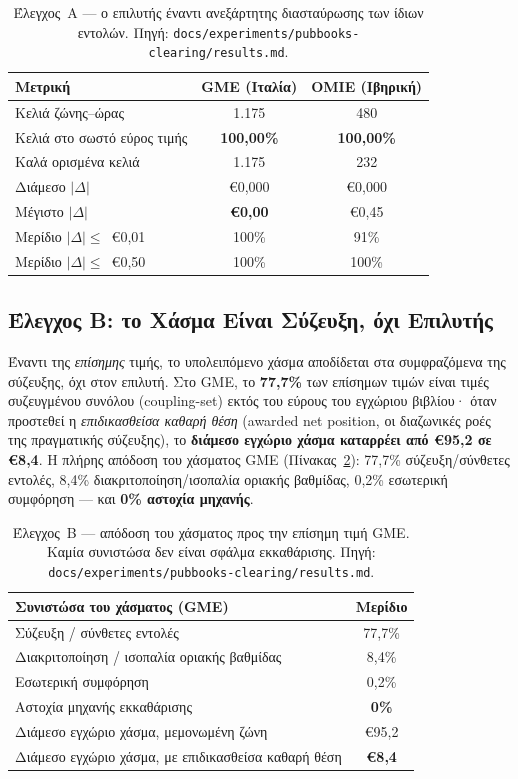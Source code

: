 \begin{table}[htbp]
\centering
\caption{Έλεγχος~Α --- ο επιλυτής έναντι ανεξάρτητης διασταύρωσης των ίδιων εντολών. Πηγή: \texttt{docs/experiments/pubbooks-clearing/results.md}.}
\label{tab:pubbooks-solver}
\begin{tabular}{@{}lcc@{}}
\toprule
\textbf{Μετρική} & \textbf{GME (Ιταλία)} & \textbf{OMIE (Ιβηρική)} \\
\midrule
Κελιά ζώνης--ώρας & 1.175 & 480 \\
Κελιά στο σωστό εύρος τιμής & \textbf{100,00\%} & \textbf{100,00\%} \\
Καλά ορισμένα κελιά & 1.175 & 232 \\
Διάμεσο $|\Delta|$ & €0,000 & €0,000 \\
Μέγιστο $|\Delta|$ & \textbf{€0,00} & €0,45 \\
Μερίδιο $|\Delta|\le$~€0,01 & 100\% & 91\% \\
Μερίδιο $|\Delta|\le$~€0,50 & 100\% & 100\% \\
\bottomrule
\end{tabular}
\end{table}

\subsection{Έλεγχος Β: το Χάσμα Είναι Σύζευξη, όχι Επιλυτής}
\label{subsec:pubbooks-attribution}

Έναντι της \emph{επίσημης} τιμής, το υπολειπόμενο χάσμα αποδίδεται στα συμφραζόμενα της σύζευξης, όχι στον επιλυτή. Στο GME, το \textbf{77,7\%} των επίσημων τιμών είναι τιμές συζευγμένου συνόλου (coupling-set) εκτός του εύρους του εγχώριου βιβλίου· όταν προστεθεί η \emph{επιδικασθείσα καθαρή θέση} (awarded net position, οι διαζωνικές ροές της πραγματικής σύζευξης), το \textbf{διάμεσο εγχώριο χάσμα καταρρέει από €95,2 σε €8,4}. Η πλήρης απόδοση του χάσματος GME (Πίνακας~\ref{tab:pubbooks-attr}): 77,7\% σύζευξη/σύνθετες εντολές, 8,4\% διακριτοποίηση/ισοπαλία οριακής βαθμίδας, 0,2\% εσωτερική συμφόρηση --- και \textbf{0\% αστοχία μηχανής}.

\begin{table}[htbp]
\centering
\caption{Έλεγχος~Β --- απόδοση του χάσματος προς την επίσημη τιμή GME. Καμία συνιστώσα δεν είναι σφάλμα εκκαθάρισης. Πηγή: \texttt{docs/experiments/pubbooks-clearing/results.md}.}
\label{tab:pubbooks-attr}
\begin{tabular}{@{}lc@{}}
\toprule
\textbf{Συνιστώσα του χάσματος (GME)} & \textbf{Μερίδιο} \\
\midrule
Σύζευξη / σύνθετες εντολές & 77,7\% \\
Διακριτοποίηση / ισοπαλία οριακής βαθμίδας & 8,4\% \\
Εσωτερική συμφόρηση & 0,2\% \\
Αστοχία μηχανής εκκαθάρισης & \textbf{0\%} \\
\midrule
Διάμεσο εγχώριο χάσμα, μεμονωμένη ζώνη & €95,2 \\
Διάμεσο εγχώριο χάσμα, με επιδικασθείσα καθαρή θέση & \textbf{€8,4} \\
\bottomrule
\end{tabular}
\end{table}

